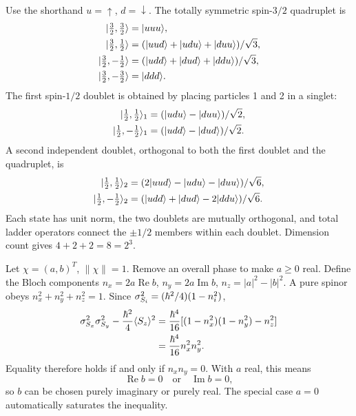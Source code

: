 Use the shorthand $u=\uparrow$, $d=\downarrow$.
The totally symmetric spin-$3/2$ quadruplet is
\begin{align}
\lvert \tfrac32,\tfrac32\rangle&=\lvert uuu\rangle,\\
\lvert \tfrac32,\tfrac12\rangle&=
(\lvert uud\rangle+\lvert udu\rangle+\lvert duu\rangle)/\sqrt3,\\
\lvert \tfrac32,-\tfrac12\rangle&=
(\lvert udd\rangle+\lvert dud\rangle+\lvert ddu\rangle)/\sqrt3,\\
\lvert \tfrac32,-\tfrac32\rangle&=\lvert ddd\rangle.
\end{align}
The first spin-$1/2$ doublet is obtained by
placing particles 1 and 2 in a singlet:
\begin{align}
\lvert \tfrac12,\tfrac12\rangle_{1}
&=(\lvert udu\rangle-\lvert duu\rangle)/\sqrt2,\\
\lvert \tfrac12,-\tfrac12\rangle_{1}
&=(\lvert udd\rangle-\lvert dud\rangle)/\sqrt2.
\end{align}
A second independent doublet, orthogonal
to both the first doublet and the quadruplet,
is
\begin{align}
\lvert \tfrac12,\tfrac12\rangle_{2}
&=(2\lvert uud\rangle-\lvert udu\rangle-\lvert duu\rangle)/\sqrt6,\\
\lvert \tfrac12,-\tfrac12\rangle_{2}
&=(\lvert udd\rangle+\lvert dud\rangle-2\lvert ddu\rangle)/\sqrt6.
\end{align}
Each state has unit norm, the two doublets
are mutually orthogonal, and total
ladder operators connect the $\pm1/2$
members within each doublet. Dimension
count gives $4+2+2=8=2^3$.

Let $\chi=(a,b)^T$, $\|\chi\|=1$.
Remove an overall phase to make $a\ge0$ real.
Define the Bloch components
$n_x=2a\operatorname{Re}b$,
$n_y=2a\operatorname{Im}b$,
$n_z=|a|^2-|b|^2$.
A pure spinor obeys $n_x^2+n_y^2+n_z^2=1$.
Since $\sigma_{S_i}^2=
(\hbar^2/4)(1-n_i^2)$,
\begin{align}
\sigma_{S_x}^2\sigma_{S_y}^2
-\frac{\hbar^2}{4}\langle S_z\rangle^2
&=\frac{\hbar^4}{16}
[(1-n_x^2)(1-n_y^2)-n_z^2]\\
&=\frac{\hbar^4}{16}n_x^2n_y^2.
\end{align}
Equality therefore holds if and only if
$n_xn_y=0$. With $a$ real, this means
\begin{equation}
\boxed{\operatorname{Re}b=0
\quad\text{or}\quad\operatorname{Im}b=0},
\end{equation}
so $b$ can be chosen purely imaginary
or purely real. The special case $a=0$
automatically saturates the inequality.

